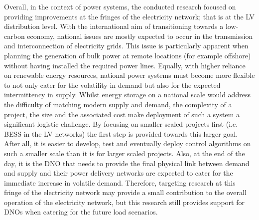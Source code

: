 Overall, in the context of power systems, the conducted research focused on providing improvements at the fringes of the electricity network; that is at the LV distribution level.
With the international aim of transitioning towards a low-carbon economy, national issues are mostly expected to occur in the transmission and interconnection of electricity grids.
This issue is particularly apparent when planning the generation of bulk power at remote locations (for example offshore) without having installed the required power lines.
Equally, with higher reliance on renewable energy resources, national power systems must become more flexible to not only cater for the volatility in demand but also for the expected intermittency in supply.
Whilst energy storage on a national scale would address the difficulty of matching modern supply and demand, the complexity of a project, the size and the associated cost make deployment of such a system a significant logistic challenge.
By focusing on smaller scaled projects first (i.e. BESS in the LV networks) the first step is provided towards this larger goal.
After all, it is easier to develop, test and eventually deploy control algorithms on such a smaller scale than it is for larger scaled projects.
Also, at the end of the day, it is the DNO that needs to provide the final physical link between demand and supply and their power delivery networks are expected to cater for the immediate increase in volatile demand.
Therefore, targeting research at this fringe of the electricity network may provide a small contribution to the overall operation of the electricity network, but this research still provides support for DNOs when catering for the future load scenarios.

